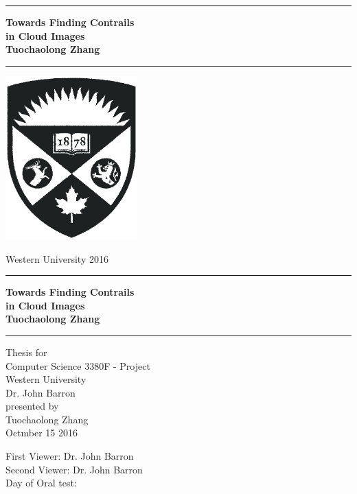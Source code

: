 \documentclass[12pt]{book}
\newcommand{\LMUTitle}[9]{
  \thispagestyle{empty}
  \vspace*{\stretch{1}}
  {\parindent0cm
   \rule{\linewidth}{.7ex}}
  \begin{flushright}

    \vspace*{\stretch{1}}
    \sffamily\bfseries\Huge
    #1\\
    \vspace*{\stretch{1}}
    \sffamily\bfseries\large
    #2
    \vspace*{\stretch{1}}
  \end{flushright}
  \rule{\linewidth}{.7ex}
  \vspace*{\stretch{5}}
  \begin{center}
    \includegraphics[width=2in]{siegel}
  \end{center}
  \vspace*{\stretch{1}}
  \begin{center}\sffamily\LARGE{#5}\end{center}
  \newpage
  \thispagestyle{empty}

  \cleardoublepage
  \thispagestyle{empty}

  \vspace*{\stretch{1}}
  {\parindent0cm
  \rule{\linewidth}{.7ex}}
  \begin{flushright}
    \vspace*{\stretch{1}}
    \sffamily\bfseries\Huge
    #1\\
    \vspace*{\stretch{1}}
    \sffamily\bfseries\large
    #2
    \vspace*{\stretch{1}}
  \end{flushright}
  \rule{\linewidth}{.7ex}

  \vspace*{\stretch{3}}
  \begin{center}
    \Large Thesis for\\
    \Large Computer Science 3380F -	Project\\
    \Large Western University\\
    \Large Dr. John Barron\\
    \vspace*{\stretch{1}}
    \Large presented by\\
    \Large #2\\
    \vspace*{\stretch{2}}
    \Large #6
  \end{center}

  \newpage
  \thispagestyle{empty}

  \vspace*{\stretch{1}}

  \begin{flushleft}
    \large First Viewer:  #7 \\[1mm]
    \large Second Viewer:  #8 \\[1mm]
    \large Day of Oral test: #9\\
  \end{flushleft}

  \cleardoublepage
}
\begin{document}
  \frontmatter


  \LMUTitle
      {Towards Finding Contrails\\ in Cloud Images}
      {Tuochaolong Zhang}
      {}                                        %
      {Computer Science}                        %
      {Western University 2016}                 %
      {Octmber 15 2016}                         %
      {Dr. John Barron}                         %
      {Dr. John Barron}                         %
      {}                         %


  \tableofcontents


  \listoffigures


  \listoftables
  \cleardoublepage


  


  \mainmatter\setcounter{page}{1}
  
  
  
  
  
  

  \backmatter
  
  \markboth{}{}

  
\end{document}

